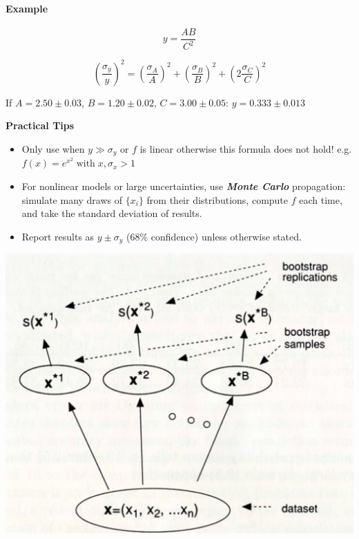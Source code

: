 \documentclass[10pt]{article}
\begin{document}
\begin{multicols*}{2}
\paragraph{Example}
\[
y = \frac{AB}{C^2}
\]

\[
\left(\frac{\sigma_y}{y}\right)^2 =
\left(\frac{\sigma_A}{A}\right)^2 +
\left(\frac{\sigma_B}{B}\right)^2 +
\left(2\frac{\sigma_C}{C}\right)^2
\]

If \(A=2.50\pm0.03\), \(B=1.20\pm0.02\), \(C=3.00\pm0.05\):
$y = 0.333 \pm 0.013$

\textbf{Practical Tips}

\begin{itemize}
  \item Only use when $y\gg \sigma_{y}$ or $f$ is linear otherwise this formula
  does not hold! e.g. $f(x)=e^{x^2} \;\text{with} \;x,\sigma_x>1$
    \item For nonlinear models or large uncertainties, use \textbf{\textit{Monte Carlo}} propagation:
  simulate many draws of \(\{x_i\}\) from their distributions, compute \(f\) each time, and take the standard deviation of results.
  \item Report results as \( y \pm \sigma_y \) (68\% confidence) unless otherwise stated.
\end{itemize}
\columnbreak
\begin{minipage}{\columnwidth}
\centering
\includegraphics[width=.9\linewidth]{bootstrap_diagram.png}
\end{minipage}

\begin{tcolorbox}[cheatbox]

\end{tcolorbox}
\end{multicols*}
\end{document}

